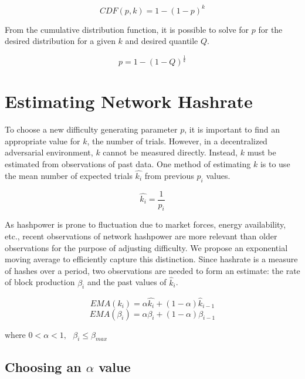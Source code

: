 \documentclass[]{article}
\begin{document}
\begin{equation}
CDF(p, k) = 1 - (1 - p)^k
\end{equation}

\pagebreak
From the cumulative distribution function, it is possible to solve for $p$ for the desired distribution for a given $k$ and desired quantile $Q$.  

\begin{equation}
p = 1 - (1 - Q)^\frac{1}{k}
\end{equation}

\section{Estimating Network Hashrate}
To choose a new difficulty generating parameter $p$, it is important to find an appropriate value for $k$, the number of trials.  However, in a decentralized adversarial environment, $k$ cannot be measured directly.  Instead, $k$ must be estimated from observations of past data.  One method of estimating $k$ is to use the mean number of expected trials $\hat{k_i} $ from previous $p_i$ values.  
 
\begin{equation}
\hat{k_{i}} = \frac{1}{p_{i}}
\end{equation}

As hashpower is prone to fluctuation due to market forces, energy availability, etc., recent observations of network hashpower are more relevant than older observations for the purpose of adjusting difficulty.  We propose an exponential moving average to efficiently capture this distinction.  Since hashrate is a measure of hashes over a period, two observations are needed to form an estimate: the rate of block production $\beta_i$ and the past values of $\hat{k}_i$.

\begin{equation}
EMA(k_{i}) = \alpha \hat{k_{i}} + (1 - \alpha) \hat{k}_{i - 1}
\end{equation} 
\begin{equation}
EMA(\beta_{i}) = \alpha \beta_{i} + (1 - \alpha) \beta_{i - 1} 
\end{equation}
\centerline{$\text{where } 0 < \alpha < 1, \text{ } \beta_{i} \leq \beta_{max}$}
\newline

\subsection{Choosing an $\alpha$ value}
\end{document}
